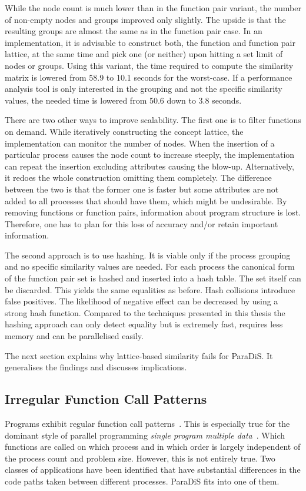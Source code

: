 \documentclass[a4paper, final, diplominf]{zih-template}
\begin{document}
While the node count is much lower than in the function pair variant, the number of non-empty nodes and groups improved only slightly.
The upside is that the resulting groups are almost the same as in the function pair case.
In an implementation, it is advisable to construct both, the function and function pair lattice, at the same time and pick one (or neither) upon hitting a set limit of nodes or groups.
Using this variant, the time required to compute the similarity matrix is lowered from 58.9 to 10.1 seconds for the worst-case.
If a performance analysis tool is only interested in the grouping and not the specific similarity values, the needed time is lowered from 50.6 down to 3.8 seconds.

There are two other ways to improve scalability.
The first one is to filter functions on demand.
While iteratively constructing the concept lattice, the implementation can monitor the number of nodes.
When the insertion of a particular process causes the node count to increase steeply, the implementation can repeat the insertion excluding attributes causing the blow-up.
Alternatively, it redoes the whole construction omitting them completely.
The difference between the two is that the former one is faster but some attributes are not added to all processes that should have them, which might be undesirable.
By removing functions or function pairs, information about program structure is lost.
Therefore, one has to plan for this loss of accuracy and/or retain important information.

The second approach is to use hashing.
It is viable only if the process grouping and no specific similarity values are needed.
For each process the canonical form of the function pair set is hashed and inserted into a hash table.
The set itself can be discarded.
This yields the same equalities as before.
Hash collisions introduce false positives.
The likelihood of negative effect can be decreased by using a strong hash function.
Compared to the techniques presented in this thesis the hashing approach can only detect equality but is extremely fast, requires less memory and can be parallelised easily.

The next section explains why lattice-based similarity fails for ParaDiS.
It generalises the findings and discusses implications.

\subsection{Irregular Function Call Patterns}
\label{sec:evaluation-scalability-irregular}
Programs exhibit regular function call patterns~\cite{allineaddt, arnold07, johnson91}.
This is especially true for the dominant style of parallel programming \emph{single program multiple data}~\cite{spmd}.
Which functions are called on which process and in which order is largely independent of the process count and problem size.
However, this is not entirely true.
Two classes of applications have been identified that have substantial differences in the code paths taken between different processes.
ParaDiS fits into one of them.
\end{document}
